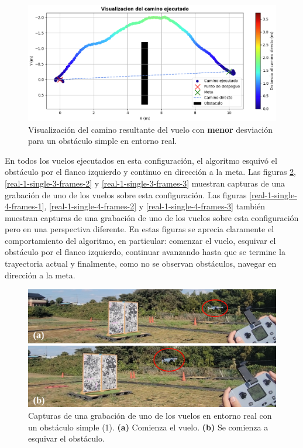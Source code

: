 \begin{figure}[H]
    \centering
    \includegraphics[scale=0.47]{partes/ImgJoao/real-1-single-1-graph-best.png}
    \caption[Visualización del camino resultante del vuelo con menor desviación para un obstáculo simple en entorno real.]{Visualización del camino resultante del vuelo con \textbf{menor} desviación para un obstáculo simple en entorno real.}
    \label{real-1-single-1-graph-best}
\end{figure}

En todos los vuelos ejecutados en esta configuración, el algoritmo esquivó el obstáculo por el flanco izquierdo y continuo en dirección a la meta. Las figuras \ref{real-1-single-3-frames-1}, \ref{real-1-single-3-frames-2} y \ref{real-1-single-3-frames-3} muestran capturas de una grabación de uno de los vuelos sobre esta configuración. Las figuras \ref{real-1-single-4-frames-1}, \ref{real-1-single-4-frames-2} y \ref{real-1-single-4-frames-3} también muestran capturas de una grabación de uno de los vuelos sobre esta configuración pero en una perspectiva diferente. En estas figuras se aprecia claramente el comportamiento del algoritmo, en particular: comenzar el vuelo, esquivar el obstáculo por el flanco izquierdo, continuar avanzando hasta que se termine la trayectoria actual y finalmente, como no se observan obstáculos, navegar en dirección a la meta.

\begin{figure}[H]
    \centering
    \includegraphics[scale=0.25]{partes/ImgJoao/real-1-single-3-frames-1.png}
    \caption[Capturas de una grabación de uno de los vuelos en entorno real con un obstáculo simple (1).]{Capturas de una grabación de uno de los vuelos en entorno real con un obstáculo simple (1). \textbf{(a)} Comienza el vuelo. \textbf{(b)} Se comienza a esquivar el obstáculo.}
    \label{real-1-single-3-frames-1}
\end{figure}

